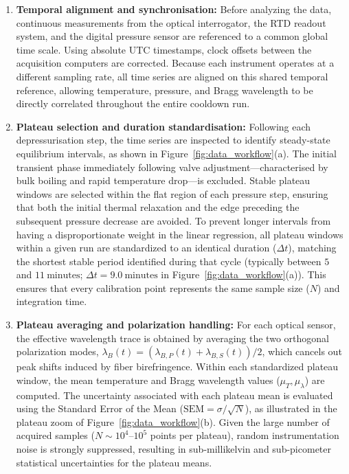 \documentclass[preprint,11pt]{elsarticle}
\begin{document}
\begin{enumerate}
    \item \textbf{Temporal alignment and synchronisation:}
    Before analyzing the data, continuous measurements from the optical interrogator, the RTD readout system, and the digital pressure sensor are referenced to a common global time scale. Using absolute UTC timestamps, clock offsets between the acquisition computers are corrected. Because each instrument operates at a different sampling rate, all time series are aligned on this shared temporal reference, allowing temperature, pressure, and Bragg wavelength to be directly correlated throughout the entire cooldown run.

    \item \textbf{Plateau selection and duration standardisation:}
    Following each depressurisation step, the time series are inspected to identify steady-state equilibrium intervals, as shown in Figure~\ref{fig:data_workflow}(a). The initial transient phase immediately following valve adjustment---characterised by bulk boiling and rapid temperature drop---is excluded. Stable plateau windows are selected within the flat region of each pressure step, ensuring that both the initial thermal relaxation and the edge preceding the subsequent pressure decrease are avoided. To prevent longer intervals from having a disproportionate weight in the linear regression, all plateau windows within a given run are standardized to an identical duration ($\Delta t$), matching the shortest stable period identified during that cycle (typically between $5$ and $11~\text{minutes}$; $\Delta t = 9.0~\text{minutes}$ in Figure~\ref{fig:data_workflow}(a)). This ensures that every calibration point represents the same sample size ($N$) and integration time.

    \item \textbf{Plateau averaging and polarization handling:}
    For each optical sensor, the effective wavelength trace is obtained by averaging the two orthogonal polarization modes, $\lambda_B(t) = (\lambda_{B,P}(t) + \lambda_{B,S}(t))/2$, which cancels out peak shifts induced by fiber birefringence. Within each standardized plateau window, the mean temperature and Bragg wavelength values ($\mu_T, \mu_\lambda$) are computed. The uncertainty associated with each plateau mean is evaluated using the Standard Error of the Mean ($\text{SEM} = \sigma / \sqrt{N}$), as illustrated in the plateau zoom of Figure~\ref{fig:data_workflow}(b). Given the large number of acquired samples ($N \sim 10^4$--$10^5$ points per plateau), random instrumentation noise is strongly suppressed, resulting in sub-millikelvin and sub-picometer statistical uncertainties for the plateau means.


\end{enumerate}
\end{document}
